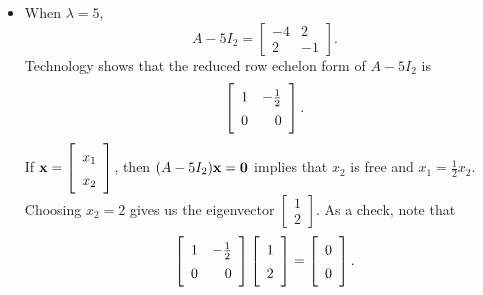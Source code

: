 \begin{example}
\begin{itemize}
\item When $\lambda = 5$, 
\[A - 5 I_2 = \left[ \begin{array}{rr} -4&2\\2&-1 \end{array} \right].\]
Technology shows that the reduced row echelon form of $A-5I_2$ is 
\[\left[ \renewcommand{\arraystretch}{1.4} \begin{array}{cr} 1&-\frac{1}{2} \\ 0&0 \end{array} \right].\]
If $\vx = \left[ \begin{array}{c} x_1\\x_2 \end{array} \right]$, then $(A - 5I_2)\mathbf{x} = \mathbf{0}$ implies that $x_2$ is free and $x_1 = \frac{1}{2}x_2$. Choosing $x_2 = 2$ gives us the eigenvector $\left[ \begin{array}{c} 1\\2 \end{array} \right]$. As a check, note that 
\[\left[ \renewcommand{\arraystretch}{1.4} \begin{array}{cr} 1&-\frac{1}{2} \\ 0&0 \end{array} \right] \left[ \begin{array}{c} 1\\2 \end{array} \right] = \left[ \begin{array}{c} 0\\0 \end{array} \right].\]

\end{itemize}
\ea

\end{example}
 
